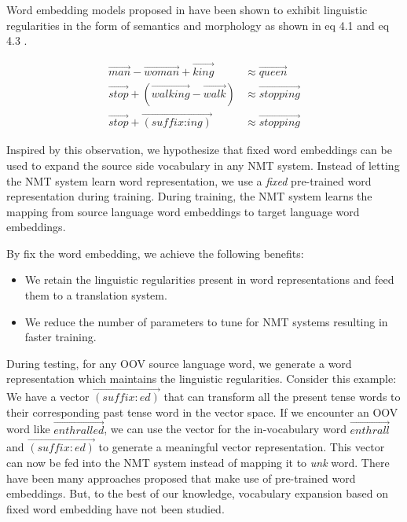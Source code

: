 Word embedding models proposed in \cite{mikolov2013distributed,pennington2014glove}  have been shown to exhibit linguistic regularities in the form of semantics  and morphology as shown in eq 4.1 and eq 4.3 \citep{soricut2015unsupervised}. 

\begin{align}
\vec{\textit{man}} - \vec{\textit{woman}} + \vec{\textit{king}} &  \approx \vec{\textit{queen}} \\
\vec{\textit{stop}} + (\vec{\textit{walking}} - \vec{\textit{walk}}) & \approx \vec{\textit{stopping}} \\
\vec{\textit{stop}} + \vec{(\textit{suffix:ing})} & \approx \vec{\textit{stopping}} 
\end{align}


Inspired by this observation, we hypothesize that fixed word embeddings can be used to expand the source side vocabulary in any NMT system. Instead of letting the NMT system learn word representation, we use a \textit{fixed} pre-trained word representation during training. During training, the NMT system learns the mapping from source language word embeddings to target language word embeddings. 

By fix the word embedding, we achieve the following benefits:
\begin{itemize}
	\item We retain the linguistic regularities present in word representations and feed them to a translation system.
	\item We reduce the number of parameters to tune for NMT systems resulting in faster training.
\end{itemize}


During testing, for any OOV source language word, we generate a word representation which maintains the linguistic regularities. Consider this example: We have a vector $\vec{(suffix:ed)}$ that can transform all the present tense words to their corresponding past tense word in the vector space. If we encounter an OOV word like \textit{$\vec{enthralled}$}, we can use the vector for the in-vocabulary word \textit{$\vec{enthrall}$} and $\vec{(suffix:ed)}$ to generate a meaningful vector representation. This vector can now be fed into the NMT system instead of mapping it to \textit{unk} word. There have been many approaches proposed that make use of pre-trained word embeddings. But, to the best of our knowledge, vocabulary expansion based on fixed word embedding have not been studied.


